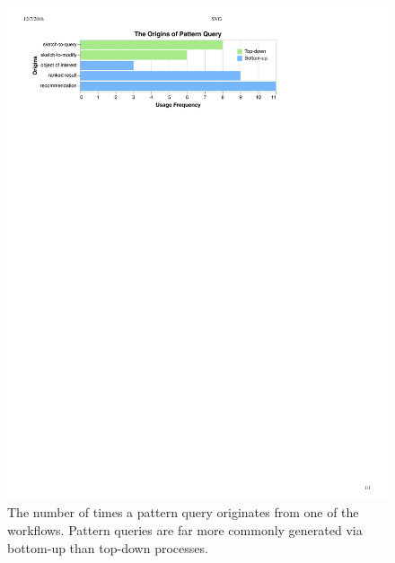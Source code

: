  \begin{figure}[h!]
   \includegraphics[width=0.95\linewidth]{figures/the_origins_of_sketch.pdf}
   \vspace{-5pt}
   \caption{The number of times a pattern query originates from one of the workflows. Pattern queries are far more commonly generated via bottom-up than top-down processes.}\label{fig:origins_of_sketch}
   \vspace{-5pt}
 \end{figure}
